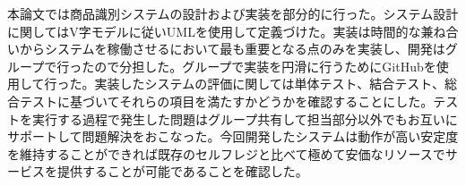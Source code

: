 本論文では商品識別システムの設計および実装を部分的に行った。システム設計に関してはV字モデルに従いUMLを使用して定義づけた。実装は時間的な兼ね合いからシステムを稼働させるにおいて最も重要となる点のみを実装し、開発はグループで行ったので分担した。グループで実装を円滑に行うためにGitHubを使用して行った。実装したシステムの評価に関しては単体テスト、結合テスト、総合テストに基づいてそれらの項目を満たすかどうかを確認することにした。テストを実行する過程で発生した問題はグループ共有して担当部分以外でもお互いにサポートして問題解決をおこなった。今回開発したシステムは動作が高い安定度を維持することができれば既存のセルフレジと比べて極めて安価なリソースでサービスを提供することが可能であることを確認した。